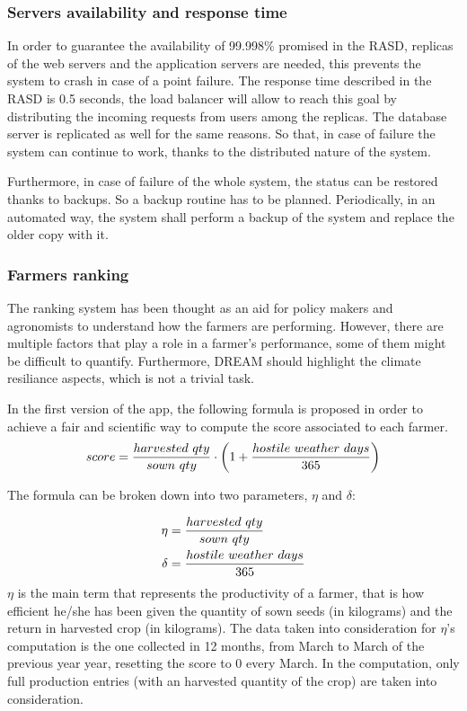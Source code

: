 \documentclass[table, 12pt]{article}
\begin{document}
\subsubsection{Servers availability and response time} 
\label{server_availability}
In order to guarantee the availability of 99.998\% promised in the RASD, replicas of the web servers and the application servers are needed, this prevents the system to crash in case of a point failure.
The response time described in the RASD is 0.5 seconds, the load balancer will allow to reach this goal by distributing the incoming requests from users among the replicas.
The database server is replicated as well for the same reasons.
So that, in case of failure the system can continue to work, thanks to the distributed nature of the system. 

Furthermore, in case of failure of the whole system, the status can be restored thanks to backups. 
So a backup routine has to be planned.
Periodically, in an automated way, the system shall perform a backup of the system and replace the older copy with it.
\subsubsection{Farmers ranking} 
The ranking system has been thought as an aid for policy makers and agronomists to understand how the farmers are performing. However, there are multiple factors that play a role in a farmer's performance, some of them might be difficult to quantify. Furthermore, DREAM should highlight the climate resiliance aspects, which is not a trivial task.

In the first version of the app, the following formula is proposed in order to achieve a fair and scientific way to compute the score associated to each farmer.
\begin{equation}
    score = {harvested\ qty\over sown\ qty}\cdot \left( 1 + {hostile\ weather\ days\over 365}\right)
\end{equation}

The formula can be broken down into two parameters, $\eta$ and $\delta$:

\begin{align}  
    \eta &= {harvested\ qty\over sown\ qty}\\
    \delta &= {hostile\ weather\ days\over 365}
\end{align}
$\eta$ is the main term that represents the productivity of a farmer, that is how efficient he/she has been given the quantity of sown seeds (in kilograms) and the return in harvested crop (in kilograms). The data taken into consideration for $\eta$'s computation is the one collected in 12 months, from March to March of the previous year year\footnotemark, resetting the score to 0 every March.
In the computation, only full production entries (with an harvested quantity of the crop) are taken into consideration.
\end{document}
